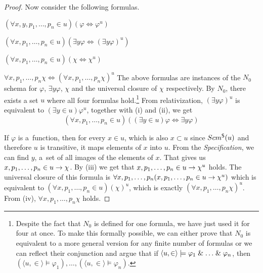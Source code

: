 \begin{proof}
Now consider the following formulas. %
\bce[(i)]
\item $(\forall x, y, p_1, \ldots, p_n \in u)(\varphi \iff \varphi^{u})$
\item $(\forall x, p_1, \ldots, p_n \in u)(\exists y \varphi \iff (\exists y \varphi)^{u})$
\item $(\forall x, p_1, \ldots, p_n \in u)(\chi \iff \chi^{u})$
\item $\forall x, p_1, \ldots, p_n \chi \iff (\forall x, p_1, \ldots, p_n \chi)^{u}$ %
\ece
The above formulas are instances of the $N_0$ schema for $\varphi$, $\exists y \varphi$, $\chi$ and the universal closure of $\chi$ respectively.
By $N_0$, there exists a set $u$ where all four formulas hold.\footnote{Despite the fact that $N_0$ is defined for one formula, we have just used it for four at once. To make this formally possible, we can either prove that $N_0$ is equivalent to a more general version for any finite number of formulas or we can reflect their conjunction and argue that if $\langle u, \in \rangle \models \varphi_1 \mathrel{\&} \ldots \mathrel{\&} \varphi_n$, then $(\langle u, \in \rangle \models \varphi_1), \ldots, (\langle u, \in \rangle \models \varphi_n)$.}
From relativization, $(\exists y \varphi)^{u}$ is equivalent to $(\exists y \in u) \varphi^{u}$, together with (i) and (ii), we get
\begin{equation}
(\forall x, p_1, \ldots, p_n \in u)((\exists y \in u)\varphi \iff \exists y \varphi)
\end{equation}

If $\varphi$ is a~function, then for every $x \in u$, which is also $x \subset u$ since $Scm^{\sf{S}}(u)$ and therefore $u$ is transitive,
it maps elements of $x$ into $u$. From the \emph{Specification}, we can find $y$, a~set of all images of the elements of $x$.
That gives us $x, p_1, \ldots, p_n \in u \rightarrow \chi$. By (iii) we get that $x, p_1, \ldots, p_n \in u \rightarrow \chi^{u}$ holds. The universal closure of this formula is $\forall x, p_1, \ldots, p_n (x, p_1, \ldots, p_n \in u \rightarrow \chi^{u})$ which is equivalent to $(\forall x, p_1, \ldots, p_n \in u)(\chi)^{u}$, which is exactly $(\forall x, p_1, \ldots, p_n \chi)^{u}$. 
From (iv), $\forall x, p_1, \ldots, p_n \chi$ holds. 
\end{proof}

